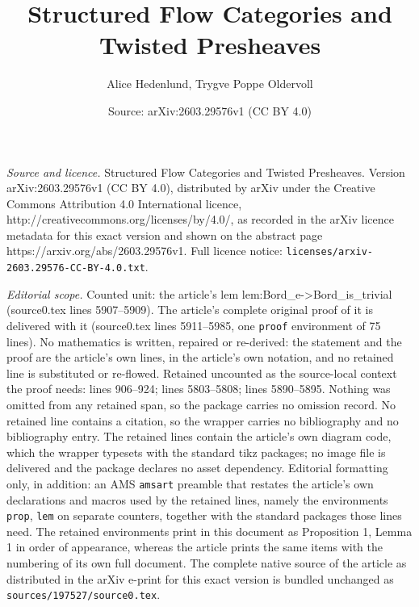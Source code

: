 \documentclass[10pt,a4paper]{amsart}
\title{Structured Flow Categories and Twisted Presheaves}
\author{Alice Hedenlund, Trygve Poppe Oldervoll}
\date{Source: arXiv:2603.29576v1 (CC BY 4.0)}
\begin{document}
\maketitle

\noindent\emph{Source and licence.} Structured Flow Categories and Twisted Presheaves. Version arXiv:2603.29576v1 (CC BY 4.0), distributed by arXiv under the Creative Commons Attribution 4.0 International licence, http://creativecommons.org/licenses/by/4.0/, as recorded in the arXiv licence metadata for this exact version and shown on the abstract page https://arxiv.org/abs/2603.29576v1. Full licence notice: \texttt{licenses/arxiv-2603.29576-CC-BY-4.0.txt}.\par\smallskip

\noindent\textit{Editorial scope.} Counted unit: the article's lem lem:Bord\_e->Bord\_is\_trivial (source0.tex lines 5907--5909). The article's complete original proof of it is delivered with it (source0.tex lines 5911--5985, one \texttt{proof} environment of 75 lines). No mathematics is written, repaired or re-derived: the statement and the proof are the article's own lines, in the article's own notation, and no retained line is substituted or re-flowed.  Retained uncounted as the source-local context the proof needs: lines 906--924; lines 5803--5808; lines 5890--5895.  Nothing was omitted from any retained span, so the package carries no omission record.  No retained line contains a citation, so the wrapper carries no bibliography and no bibliography entry.  The retained lines contain the article's own diagram code, which the wrapper typesets with the standard tikz packages; no image file is delivered and the package declares no asset dependency.  Editorial formatting only, in addition: an AMS \texttt{amsart} preamble that restates the article's own declarations and macros used by the retained lines, namely the environments \texttt{prop}, \texttt{lem} on separate counters, together with the standard packages those lines need.  The retained environments print in this document as Proposition 1, Lemma 1 in order of appearance, whereas the article prints the same items with the numbering of its own full document.  The complete native source of the article as distributed in the arXiv e-print for this exact version is bundled unchanged as \texttt{sources/197527/source0.tex}.
\end{document}
